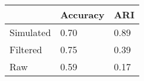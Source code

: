 \begin{tabular}{lll}
\toprule
{} & Accuracy &   ARI \\
\midrule
Simulated &     0.70 &  0.89 \\
Filtered  &     0.75 &  0.39 \\
Raw       &     0.59 &  0.17 \\
\bottomrule
\end{tabular}

